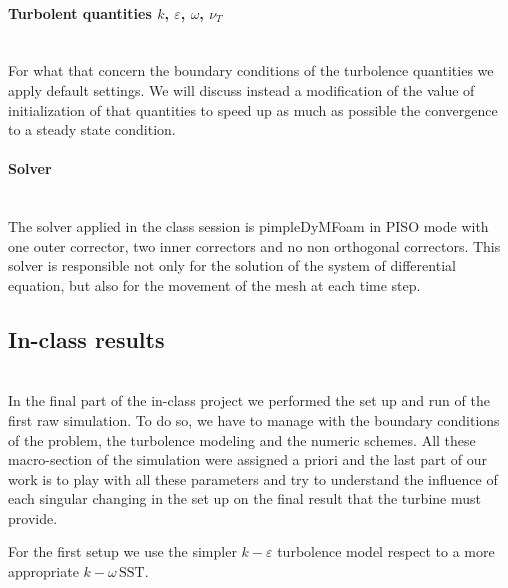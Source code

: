 \documentclass[a4paper,12pt]{article}
\begin{document}
\paragraph{Turbolent quantities $k$, $\varepsilon$, $\omega$, $\nu_T$}\mbox{}\\
For what that concern the boundary conditions of the turbolence quantities we apply default settings.
We will discuss instead a modification of the value of initialization of that quantities to speed up as much as possible the convergence to a steady state condition.

\paragraph{Solver}\mbox{}\\
The solver applied in the class session is pimpleDyMFoam in PISO mode with one outer corrector, two inner correctors and no non orthogonal correctors. This solver is responsible not only for the solution of the system of differential equation, but also for the movement of the mesh at each time step. 

\subsection{In-class results}\mbox{}\\
In the final part of the in-class project we performed the set up and run of the first raw simulation.
To do so, we have to manage with the boundary conditions of the problem, the turbolence modeling and the numeric schemes. All these macro-section of the simulation were assigned a priori and the last part of our work is to play with all these parameters and try to understand the influence of each singular changing in the set up on the final result that the turbine must provide.

For the first setup we use the simpler $k\!-\!\varepsilon$ turbolence model respect to a more appropriate $k\!-\!\omega \, \text{SST}$.
\end{document}
